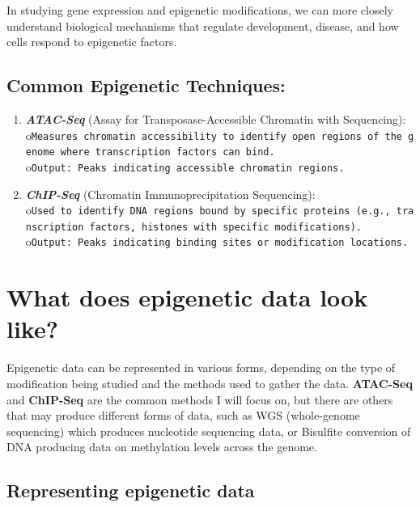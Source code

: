 \documentclass[
]{book}
\begin{document}
In studying gene expression and epigenetic modifications, we can more closely understand biological mechanisms that regulate development, disease, and how cells respond to epigenetic factors.

\subsection{Common Epigenetic Techniques:}\label{common-epigenetic-techniques}

\begin{enumerate}
\def\labelenumi{\arabic{enumi}.}
\item
  \textbf{\emph{ATAC-Seq}} (Assay for Transposase-Accessible Chromatin with Sequencing):
  o\texttt{Measures\ chromatin\ accessibility\ to\ identify\ open\ regions\ of\ the\ genome\ where\ transcription\ factors\ can\ bind.}
  o\texttt{Output:\ Peaks\ indicating\ accessible\ chromatin\ regions.}
\item
  \textbf{\emph{ChIP-Seq}} (Chromatin Immunoprecipitation Sequencing):
  o\texttt{Used\ to\ identify\ DNA\ regions\ bound\ by\ specific\ proteins\ (e.g.,\ transcription\ factors,\ histones\ with\ specific\ modifications).}
  o\texttt{Output:\ Peaks\ indicating\ binding\ sites\ or\ modification\ locations.}
\end{enumerate}

\section{What does epigenetic data look like?}\label{what-does-epigenetic-data-look-like}

Epigenetic data can be represented in various forms, depending on the type of modification being studied and the methods used to gather the data. \textbf{ATAC-Seq} and \textbf{ChIP-Seq} are the common methods I will focus on, but there are others that may produce different forms of data, such as WGS (whole-genome sequencing) which produces nucleotide sequencing data, or Bisulfite conversion of DNA producing data on methylation levels across the genome.

\subsection{Representing epigenetic data}\label{representing-epigenetic-data}
\end{document}
